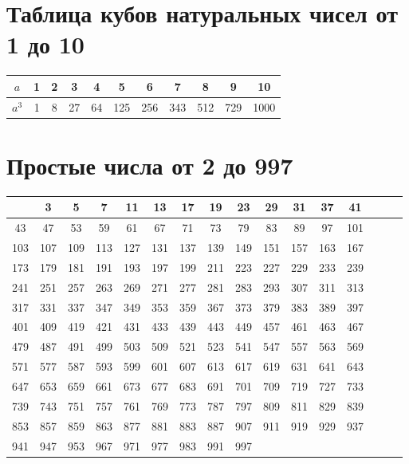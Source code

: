 \documentclass[a5paper, 8pt]{extarticle}
\begin{document}
\section{Таблица кубов натуральных чисел от 1 до 10}

\begin{center}
{\setlength{\extrarowheight}{3pt}
\begin{tabular}{|c|c|c|c|c|c|c|c|c|c|c|}
\hline 
$a$     & 1 & 2 & 3   &  4 & 5 & 6 & 7 & 8 & 9 &10\\ 
\hline 
$a^3$ &1 & 8 & 27 & 64 & 125 & 256 & 343 & 512 & 729 & 1000 \\ 
\hline 
\end{tabular} 
}
\end{center}


\section{Простые числа от 2 до 997}

\begin{center}
{\setlength{\extrarowheight}{3pt}
\begin{tabular}{|c|c|c|c|c|c|c|c|c|c|c|c|c|c|c|c|}
\hline 
\rowcolor{Gray}
\hline 
2  & 3 & 5 & 7 & 11 & 13 & 17 & 19 & 23 & 29 & 31 & 37 & 41\\ 
\hline 
43 & 47 & 53 & 59 & 61 & 67 & 71 & 73 & 79 & 83 & 89 & 97 & 101  \\
\hline 
\rowcolor{Gray}
103 &107 & 109 & 113  & 127 & 131 & 137 & 139 & 149 & 151 & 157 & 163 & 167\\ 
\hline 
173 & 179 & 181 & 191 & 193 & 197 & 199 & 211 & 223 & 227 & 229 & 233 & 239 \\
\hline 
\rowcolor{Gray}
241 & 251 & 257 & 263  & 269 & 271 & 277 & 281 & 283 & 293 & 307 & 311 & 313\\ 
\hline 
317 & 331 & 337 & 347 & 349 & 353 & 359 & 367 & 373 & 379 & 383 & 389 & 397 \\
\hline 
\rowcolor{Gray}
401 & 409 & 419 & 421  & 431 & 433 & 439 & 443 & 449 & 457 & 461 & 463 & 467\\ 
\hline 
479 & 487 & 491 & 499 & 503 & 509 & 521 & 523 & 541 & 547 & 557 & 563 & 569 \\
\hline 
\rowcolor{Gray}
571 & 577 & 587 & 593  & 599 & 601 & 607 & 613 & 617 & 619 & 631 & 641 & 643\\
 \hline 
647 & 653 & 659 & 661 & 673 & 677 & 683 & 691 & 701 & 709 & 719 & 727 & 733 \\
\hline 
\rowcolor{Gray}
739 & 743 & 751 & 757  & 761 & 769 & 773 & 787 & 797 & 809 & 811 & 829 & 839\\
 \hline 
853 & 857 & 859 & 863 & 877 & 881 & 883 & 887 & 907 & 911 & 919 & 929 & 937 \\
\hline 
\rowcolor{Gray}
941 & 947 & 953 & 967  & 971 & 977 & 983 & 991 & 997 &  &  &  & \\
\hline
\end{tabular} 
}
\end{center}
\end{document}

